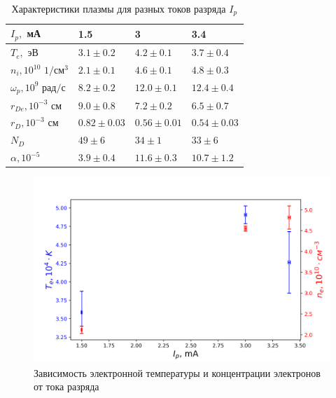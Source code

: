 \documentclass[a4paper,12pt]{article} %
\begin{document}
\begin{table}[h!]
\caption{Характеристики плазмы для разных токов разряда $I_p$}
\label{data}
\begin{tabular}{|l|l|l|l|}
\hline
$I_p,$ мА                & 1.5               & 3                 & 3.4               \\ \hline
$T_e,$ эВ                & $ 3.1 \pm 0.2 $   & $ 4.2 \pm 0.1 $   & $ 3.7 \pm 0.4 $   \\ \hline
$n_i, 10^{10}$ $ 1/см^3$    & $ 2.1 \pm 0.1 $   & $ 4.6 \pm 0.1 $   & $ 4.8 \pm 0.3 $   \\ \hline
$\omega_p, 10^{9}$ $ рад/с$ & $ 8.2 \pm 0.2 $   & $ 12.0 \pm 0.1 $  & $ 12.4 \pm 0.4 $  \\ \hline
$r_{De}, 10^{-3} $ $см$     & $ 9.0 \pm 0.8 $   & $ 7.2 \pm 0.2 $   & $ 6.5 \pm 0.7 $   \\ \hline
$r_{D}, 10^{-3} $ $см$      & $ 0.82 \pm 0.03 $ & $ 0.56 \pm 0.01 $ & $ 0.54 \pm 0.03 $ \\ \hline
$N_{D}$                  & $ 49 \pm 6 $      & $ 34 \pm 1 $      & $ 33 \pm 6 $      \\ \hline
$\alpha, 10^{-5}$        & $ 3.9 \pm 0.4 $   & $ 11.6 \pm 0.3 $  & $ 10.7 \pm 1.2 $  \\ \hline
\end{tabular}
\end{table}

\begin{figure}[h!]
\begin{center}
\includegraphics[width=\textwidth]{T,n(I_p)}
\caption{Зависимость электронной температуры и концентрации электронов от тока разряда} \label{от_тока_разряда}
\end{center}
\end{figure}
\end{document}
